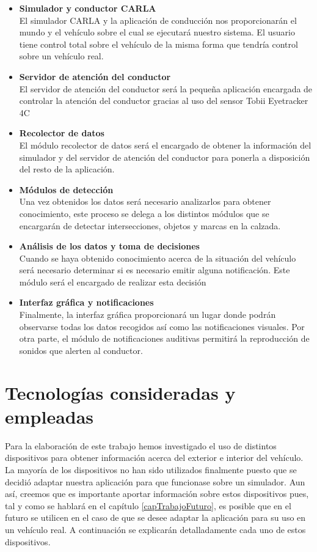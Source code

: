 \begin{itemize}
    \item \textbf{Simulador y conductor CARLA}\\
        El simulador CARLA y la aplicación de conducción nos proporcionarán el mundo y el vehículo sobre el cual se ejecutará nuestro sistema. El usuario tiene control total sobre el vehículo de la misma forma que tendría control sobre un vehículo real.
    \item \textbf{Servidor de atención del conductor}\\
        El servidor de atención del conductor será la pequeña aplicación encargada de controlar la atención del conductor gracias al uso del sensor Tobii Eyetracker 4C
    \item \textbf{Recolector de datos}\\
        El módulo recolector de datos será el encargado de obtener la información del simulador y del servidor de atención del conductor para ponerla a disposición del resto de la aplicación.
    \item \textbf{Módulos de detección}\\
        Una vez obtenidos los datos será necesario analizarlos para obtener conocimiento, este proceso se delega a los distintos módulos que se encargarán de detectar intersecciones, objetos y marcas en la calzada.
    \item \textbf{Análisis de los datos y toma de decisiones}\\
        Cuando se haya obtenido conocimiento acerca de la situación del vehículo será necesario determinar si es necesario emitir alguna notificación. Este módulo será el encargado de realizar esta decisión
    \item \textbf{Interfaz gráfica y notificaciones}\\
        Finalmente, la interfaz gráfica proporcionará un lugar donde podrán observarse todas los datos recogidos así como las notificaciones visuales. Por otra parte, el módulo de notificaciones auditivas permitirá la reproducción de sonidos que alerten al conductor.
\end{itemize}


\clearpage
\section{Tecnologías consideradas y empleadas} \label{sec:tecnologiasempleadas}
Para la elaboración de este trabajo hemos investigado el uso de distintos dispositivos para obtener información acerca del exterior e interior del vehículo. La mayoría de los dispositivos no han sido utilizados finalmente puesto que se decidió adaptar nuestra aplicación para que funcionase sobre un simulador. Aun así, creemos que es importante aportar información sobre estos dispositivos pues, tal y como se hablará en el capítulo \ref{capTrabajoFuturo}, es posible que en el futuro se utilicen en el caso de que se desee adaptar la aplicación para su uso en un vehículo real.
A continuación se explicarán detalladamente cada uno de estos dispositivos.

